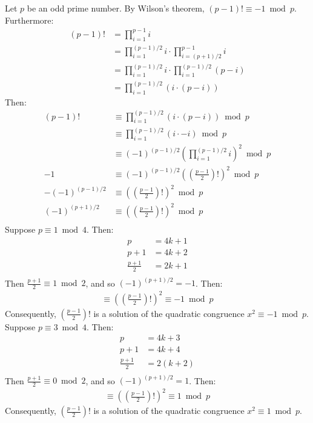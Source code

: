 \documentclass{article}
\begin{document}
\clearpage
\problem{}
Let $p$ be an odd prime number. By Wilson's theorem, $(p - 1)! \equiv -1 \bmod p$. Furthermore:
\begin{align*}
    (p - 1)! & = \prod_{i=1}^{p-1} i \\
    & = \prod_{i=1}^{(p-1)/2} i \cdot \prod_{i=(p+1)/2}^{p-1} i \\
    & = \prod_{i=1}^{(p-1)/2} i \cdot \prod_{i=1}^{(p-1)/2} (p - i) \\
    & = \prod_{i=1}^{(p-1)/2} (i \cdot (p - i))
\end{align*}
Then:
\begin{align*}
    (p - 1)! & \equiv \prod_{i=1}^{(p-1)/2} (i \cdot (p - i)) \bmod p \\
    & \equiv \prod_{i=1}^{(p-1)/2} (i \cdot -i) \bmod p \\
    & \equiv {(-1)}^{(p-1)/2}{\left(\prod_{i=1}^{(p-1)/2} i\right)}^2 \bmod p \\
    -1 & \equiv {(-1)}^{(p-1)/2}{\left(\left(\frac{p-1}{2}\right)!\right)}^2 \bmod p \\
    -{(-1)}^{(p-1)/2} & \equiv {\left(\left(\frac{p-1}{2}\right)!\right)}^2 \bmod p \\
    {(-1)}^{(p+1)/2} & \equiv {\left(\left(\frac{p-1}{2}\right)!\right)}^2 \bmod p \\
\end{align*}
Suppose $p \equiv 1 \bmod 4$. Then:
\begin{align*}
    p & = 4k + 1 \\
    p + 1 & = 4k + 2 \\
    \frac{p + 1}{2} & = 2k + 1 \\
\end{align*}
Then $\frac{p+1}{2} \equiv 1 \bmod 2$, and so ${(-1)}^{(p+1)/2} = -1$. Then:
\begin{align*}
    \equiv {\left(\left(\frac{p-1}{2}\right)!\right)}^2 \equiv -1 \bmod p
\end{align*}
Consequently, $\left(\frac{p-1}{2}\right)!$ is a solution of the quadratic congruence $x^2 \equiv -1 \bmod p$.
Suppose $p \equiv 3 \bmod 4$. Then:
\begin{align*}
    p & = 4k + 3 \\
    p + 1 & = 4k + 4 \\
    \frac{p + 1}{2} & = 2(k + 2) \\
\end{align*}
Then $\frac{p+1}{2} \equiv 0 \bmod 2$, and so ${(-1)}^{(p+1)/2} = 1$. Then:
\begin{align*}
    \equiv {\left(\left(\frac{p-1}{2}\right)!\right)}^2 \equiv 1 \bmod p
\end{align*}
Consequently, $\left(\frac{p-1}{2}\right)!$ is a solution of the quadratic congruence $x^2 \equiv 1 \bmod p$.
\end{document}
